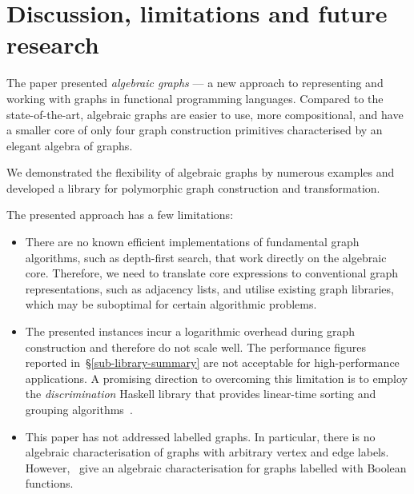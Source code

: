 \section{Discussion, limitations and future research}\label{sec-discussion}

The paper presented \emph{algebraic graphs} --- a new approach to representing and
working with graphs in functional programming languages.
Compared to the state-of-the-art, algebraic graphs are easier to use,
more compositional, and have a smaller core of only four graph
construction primitives characterised by an elegant algebra of graphs.

We demonstrated the flexibility of algebraic graphs by numerous examples and
developed a library for polymorphic graph construction and transformation.

The presented approach has a few limitations:

\begin{itemize}
    \item There are no known efficient implementations of fundamental graph
    algorithms, such as depth-first search, that work directly on the algebraic
    core. Therefore, we need to translate core expressions to conventional
    graph representations, such as adjacency lists, and utilise existing graph
    libraries, which may be suboptimal for certain algorithmic problems.

    \item The presented  instances incur a logarithmic overhead
    during graph construction and therefore do not scale well. The performance
    figures reported in~\S\ref{sub-library-summary} are not acceptable for
    high-performance applications. A promising direction to overcoming this limitation
    is to employ the \emph{discrimination} Haskell library that provides linear-time
    sorting and grouping algorithms~\cite{2012_henglein_discriminations}.

    \item This paper has not addressed labelled graphs. In particular, there is
    no algebraic characterisation of
    graphs with arbitrary vertex and edge labels. However,~\citet{2014_algebra_mokhov}
    give an algebraic characterisation for graphs labelled with Boolean functions.
\end{itemize}

